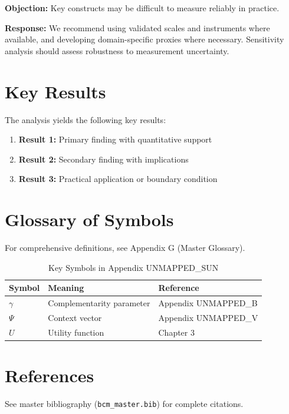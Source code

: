 \textbf{Objection:} Key constructs may be difficult to measure reliably in
practice.

\textbf{Response:} We recommend using validated scales and instruments where
available, and developing domain-specific proxies where necessary. Sensitivity
analysis should assess robustness to measurement uncertainty.





\section{Key Results}
\label{sec:sun-results}

The analysis yields the following key results:

\begin{enumerate}
    \item \textbf{Result 1:} Primary finding with quantitative support
    \item \textbf{Result 2:} Secondary finding with implications
    \item \textbf{Result 3:} Practical application or boundary condition
\end{enumerate}

\section{Glossary of Symbols}
\label{sec:sun-glossary}

For comprehensive definitions, see Appendix G (Master Glossary).

\begin{table}[htbp]
\centering
\caption{Key Symbols in Appendix UNMAPPED_SUN}
\begin{tabular}{lll}
\toprule
\textbf{Symbol} & \textbf{Meaning} & \textbf{Reference} \\
\midrule
$\gamma$ & Complementarity parameter & Appendix UNMAPPED_B \\
$\Psi$ & Context vector & Appendix UNMAPPED_V \\
$U$ & Utility function & Chapter 3 \\
\bottomrule
\end{tabular}
\end{table}


\section{References}
\label{sec:sun-references}

See master bibliography (\texttt{bcm\_master.bib}) for complete citations.

\nocite{bcm_master}

